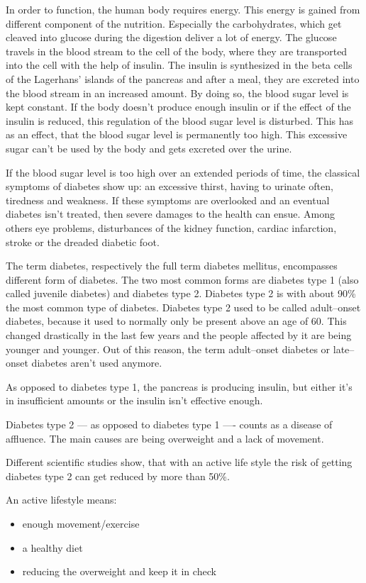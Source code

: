 \documentclass[../main.tex]{subfiles}
\begin{document}
In order to function, the human body requires energy.
This energy is gained from different component of the nutrition.
Especially the carbohydrates, which get cleaved into glucose during the digestion deliver a lot of energy.
The glucose travels in the blood stream to the cell of the body, where they are transported into the cell with the help of insulin.
The insulin is synthesized in the beta cells of the Lagerhans' islands of the pancreas and after a meal,
they are excreted into the blood stream in an increased amount.
By doing so, the blood sugar level is kept constant.
If the body doesn't produce enough insulin or if the effect of the insulin is reduced, this regulation of the blood sugar level is disturbed.
This has as an effect, that the blood sugar level is permanently too high.
This excessive sugar can't be used by the body and gets excreted over the urine.

If the blood sugar level is too high over an extended periods of time, the classical symptoms of diabetes show up:
an excessive thirst, having to urinate often,
tiredness and weakness.
If these symptoms are overlooked and an eventual diabetes isn't treated, then severe damages to the health can ensue.
Among others eye problems, disturbances of the kidney function,
cardiac infarction, stroke or the  dreaded diabetic foot.


The term diabetes, respectively the full term diabetes mellitus, encompasses different form of diabetes.
The two most common forms are diabetes type 1 (also called juvenile diabetes)
and diabetes type 2.
Diabetes type 2 is with about 90\% the most common type of diabetes.
Diabetes type 2 used to be called adult--onset diabetes, because it used to normally only be present above an age of 60.
This changed drastically in the last few years and the people affected by it are being younger and younger.
Out of this reason, the term adult--onset diabetes or late--onset diabetes aren't used anymore.

As opposed to diabetes type 1, the pancreas is producing insulin, but either it's in insufficient amounts or the insulin isn't effective enough.

Diabetes type 2 --- as opposed to diabetes type 1 ---- counts as a disease of affluence.
The main causes are being overweight and a lack of movement.

Different scientific studies show, that with an active life style the risk of getting diabetes type 2 can get reduced by more than 50\%.

An active lifestyle means:
\begin{itemize}
\item enough movement/exercise
\item a healthy diet
\item reducing the overweight and keep it in check
\end{itemize}
\end{document}

